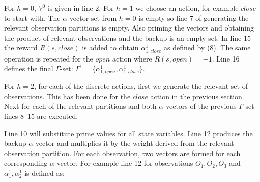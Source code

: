 \documentclass{article}
\begin{document}
For $h=0$, $V^0$ is given in line 2.  For $h=1$ we choose an action, for example $close$ to start with. The $\alpha$-vector set from $h=0$ is empty so line 7 of generating the relevant observation partitions is empty. Also priming the vectors and obtaining the product of relevant observations and the backup is an empty set. In line 15 the reward $R(s,close)$ is added to obtain $\alpha^1_{1,close}$ as defined by (8). The same operation is repeated for the $open$ action where $R(s,open)=-1$. Line 16 defines the final $\Gamma$-set: 
$\Gamma^1 = \{ \alpha^1_{1,open}, \alpha^1_{1,close} \}$.

For $h=2$, for each of the discrete actions, first we generate the relevant set of observations. This has been done for the $close$ action in the previous section. Next for each of the relevant partitions and both $\alpha$-vectors of the previous $\Gamma$ set lines 8--15 are executed. 

Line 10 will substitute prime values for all state variables. Line 12 produces the backup $\alpha$-vector and multiplies it by the weight derived from the relevant observation partition. For each observation, two vectors are formed for each corresponding $\alpha$-vector. For example line 12 for observations $O_1,O_2,O_3$ and $\alpha_1^1,\alpha_2^1$ is defined as:
\end{document}
